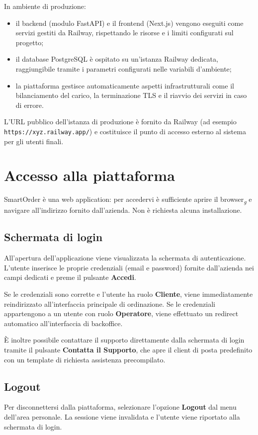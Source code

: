 \documentclass[a4paper, 11pt, oneside]{scrartcl}
\begin{document}
In ambiente di produzione:
\begin{itemize}
    \item il backend (modulo FastAPI) e il frontend (Next.js) vengono eseguiti come servizi gestiti da Railway, rispettando le risorse e i limiti configurati sul progetto;
    \item il database PostgreSQL \`e ospitato su un'istanza Railway dedicata, raggiungibile tramite i parametri configurati nelle variabili d'ambiente;
    \item la piattaforma gestisce automaticamente aspetti infrastrutturali come il bilanciamento del carico, la terminazione TLS e il riavvio dei servizi in caso di errore.
\end{itemize}

L'URL pubblico dell'istanza di produzione \`e fornito da Railway (ad esempio \texttt{https://xyz.railway.app/}) e costituisce il punto di accesso esterno al sistema per gli utenti finali.


\newpage
\section{Accesso alla piattaforma}
SmartOrder \`e una web application: per accedervi \`e sufficiente aprire il browser\textsubscript{\textit{g}} e navigare all'indirizzo fornito dall'azienda. Non \`e richiesta alcuna installazione.

\subsection{Schermata di login}
All'apertura dell'applicazione viene visualizzata la schermata di autenticazione. L'utente inserisce le proprie credenziali (email e password) fornite dall'azienda nei campi dedicati e preme il pulsante \textbf{Accedi}.

Se le credenziali sono corrette e l'utente ha ruolo \textbf{Cliente}, viene immediatamente reindirizzato all'interfaccia principale di ordinazione. Se le credenziali appartengono a un utente con ruolo \textbf{Operatore}, viene effettuato un redirect automatico all'interfaccia di backoffice.

\`E inoltre possibile contattare il supporto direttamente dalla schermata di login tramite il pulsante \textbf{Contatta il Supporto}, che apre il client di posta predefinito con un template di richiesta assistenza precompilato.

\subsection{Logout}
Per disconnettersi dalla piattaforma, selezionare l'opzione \textbf{Logout} dal menu dell'area personale. La sessione viene invalidata e l'utente viene riportato alla schermata di login.
\end{document}
